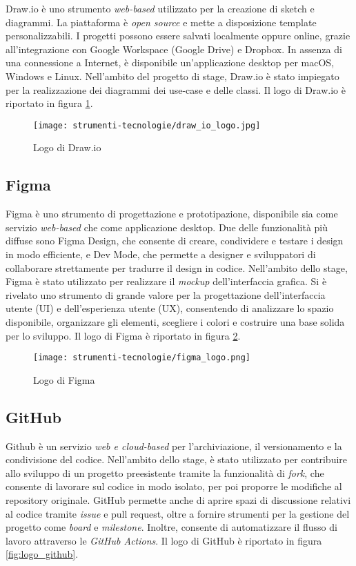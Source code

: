 Draw.io è uno strumento \textit{web-based} utilizzato per la creazione di sketch e diagrammi. La piattaforma è \textit{open source} e mette a disposizione template personalizzabili. I progetti possono essere salvati localmente oppure online, grazie all’integrazione con Google Workspace (Google Drive) e Dropbox. In assenza di una connessione a Internet, è disponibile un'applicazione desktop per macOS, Windows e Linux. Nell’ambito del progetto di stage, Draw.io è stato impiegato per la realizzazione dei diagrammi dei \gls{use-case} e delle classi. Il logo di Draw.io è riportato in figura \ref{fig:logo_draw_io}.

\begin{figure}[H]
  \centering 
  \texttt{[image: strumenti-tecnologie/draw\_io\_logo.jpg]} 
  \caption{Logo di Draw.io}
  \label{fig:logo_draw_io}
\end{figure}

\subsection*{Figma}

Figma è uno strumento di progettazione e prototipazione, disponibile sia come servizio \textit{web-based} che come applicazione desktop. Due delle funzionalità più diffuse sono Figma Design, che consente di creare, condividere e testare i design in modo efficiente, e Dev Mode, che permette a designer e sviluppatori di collaborare strettamente per tradurre il design in codice. Nell’ambito dello stage, Figma è stato utilizzato per realizzare il \textit{mockup} dell’interfaccia grafica. Si è rivelato uno strumento di grande valore per la progettazione dell'interfaccia utente (UI) e dell’esperienza utente (UX), consentendo di analizzare lo spazio disponibile, organizzare gli elementi, scegliere i colori e costruire una base solida per lo sviluppo. Il logo di Figma è riportato in figura \ref{fig:logo_figma}.

\begin{figure}[H]
  \centering 
  \texttt{[image: strumenti-tecnologie/figma\_logo.png]} 
  \caption{Logo di Figma}
  \label{fig:logo_figma}
\end{figure}

\subsection*{GitHub}

Github è un servizio \textit{web e cloud-based} per l'archiviazione, il versionamento e la condivisione del codice. Nell’ambito dello stage, è stato utilizzato per contribuire allo sviluppo di un progetto preesistente tramite la funzionalità di \textit{fork}, che consente di lavorare sul codice in modo isolato, per poi proporre le modifiche al \gls{repository} originale. GitHub permette anche di aprire spazi di discussione relativi al codice tramite \textit{issue} e \gls{pull request}, oltre a fornire strumenti per la gestione del progetto come \textit{board} e \textit{milestone}. Inoltre, consente di automatizzare il flusso di lavoro attraverso le \textit{GitHub Actions}. Il logo di GitHub è riportato in figura \ref{fig:logo_github}.

